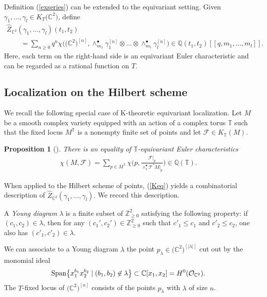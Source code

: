 \documentclass[10pt,a4paper]{amsart}
\newtheorem{Proposition}[Theorem]{Proposition}
 { \theoremstyle{definition}
\newtheorem{Definition}[Theorem]{Definition}
\newtheorem{Note}[Theorem]{Note}
\newtheorem{Example}[Theorem]{Example}
\newtheorem{Remark}[Theorem]{Remark} }
\numberwithin{equation}{section}
\def\C{\mathbb C}
\def\Q{\mathbb Q}
\def\Z{\mathbb Z}
\begin{document}
Definition (\ref{exseries}) can be extended to the equivariant setting. Given $\gamma_1,\dots,\gamma_l\in K_T\big(\C^2\big)$, define
\begin{gather*}
\hat{Z}_{\C^2}(\gamma_1,\dots,\gamma_l)(t_1,t_2)
\\ \qquad
{}=\sum_{n\geq 0} q^{n} \chi\big(\big(\C^2\big)^{[n]}, \wedge^{\bullet}_{m_1} \gamma^{[n]}_1 \otimes \dots \otimes \wedge^{\bullet}_{m_l} \gamma_l^{[n]} \big)\in \Q(t_1,t_2)[[q,m_1,\dots,m_l]].
\end{gather*}
Here, each term on the right-hand side is an equivariant Euler characteristic and can be regarded as a rational function on $T$.


\subsection{Localization on the Hilbert scheme}
We recall the following special case of K-theoretic equivariant localization. Let $M$ be a smooth complex variety equipped with an action of a complex torus $\mathbb{T}$ such that the fixed locus $M^{\mathbb{T}}$ is a nonempty finite set of points and let $\mathscr{F}\in K_{\mathbb{T}}(M)$.

\begin{Proposition}[{\cite[Theorem~3.5]{T}}]
There is an equality of $\mathbb{T}$-equivariant Euler characteristics
\begin{gather}\label{Keq}
\chi(M,\mathscr{F})=\sum_{p\in M^{\mathbb{T}}} \chi\bigg(p,\frac{\mathscr{F}|_{p}}{\wedge^{\bullet}_1 \mathcal{T}^{*}M|_p} \bigg) \in \Q(\mathbb{T}).
\end{gather}
\end{Proposition}

When applied to the Hilbert scheme of points, (\ref{Keq}) yields a combinatorial description of $\hat{Z}_{\C^2}(\gamma_1,\dots,\gamma_l).$ We record this description.

A {\em Young diagram} $\lambda$ is a finite subset of $\Z^2_{\geq 0}$ satisfying the following property: if $(c_1,c_2)\in \lambda$, then for any $(c_1',c_2')\in\Z^2_{\geq 0}$ such that $c'_1\leq c_1$ and $c'_2\leq c_2$, one also has $(c'_1,c'_2)\in \lambda$.

We can associate to a Young diagram $\lambda$ the point $p_{\lambda}\in \big(\C^2\big)^{[|\lambda|]}$ cut out by the monomial ideal
\begin{gather*}
\mathop{\rm Span}\bigl\{ x_1^{b_1}x_2^{b_2}\mid (b_1,b_2)\not\in \lambda\bigr\} \subset \C[x_1,x_2]=H^0(\mathcal{O}_{\C^2}).
\end{gather*}
The $T$-fixed locus of $\big(\C^2\big)^{[n]}$ consists of the points $p_{\lambda}$ with $\lambda$ of size $n$.
\end{document}
